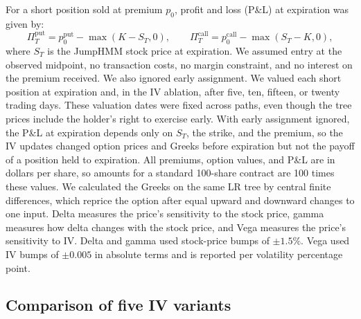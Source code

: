 For a short position sold at premium $p_0$, profit and loss (P\&L) at expiration was given by:
\begin{equation}\label{eq:terminal_pnl}
 \Pi_T^{\mathrm{put}}=p_0^{\mathrm{put}}-\max(K-S_T,0),
 \qquad
 \Pi_T^{\mathrm{call}}=p_0^{\mathrm{call}}-\max(S_T-K,0),
\end{equation}
where $S_T$ is the JumpHMM stock price at expiration. We assumed entry at the observed midpoint, no transaction costs, no margin constraint, and no interest on the premium received. We also ignored early assignment. We valued each short position at expiration and, in the IV ablation, after five, ten, fifteen, or twenty trading days. These valuation dates were fixed across paths, even though the tree prices include the holder's right to exercise early. With early assignment ignored, the P\&L at expiration depends only on $S_T$, the strike, and the premium, so the IV updates changed option prices and Greeks before expiration but not the payoff of a position held to expiration. All premiums, option values, and P\&L are in dollars per share, so amounts for a standard 100-share contract are 100 times these values. We calculated the Greeks on the same LR tree by central finite differences, which reprice the option after equal upward and downward changes to one input. Delta measures the price's sensitivity to the stock price, gamma measures how delta changes with the stock price, and Vega measures the price's sensitivity to IV. Delta and gamma used stock-price bumps of $\pm1.5\%$. Vega used IV bumps of $\pm0.005$ in absolute terms and is reported per volatility percentage point.

\subsection{Comparison of five IV variants}\label{sec:ablation_methods}

